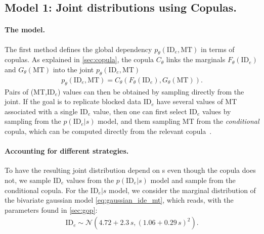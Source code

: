 \documentclass[acmlarge, manuscript,review]{acmart}
\newcommand{\mt}{\ensuremath{{\text{MT}}}\xspace}
\newcommand{\ide}{\ensuremath{{\text{ID}_e}}\xspace}
\begin{document}
\subsection{Model 1: Joint distributions using Copulas.\label{sub:model1}}

\paragraph{The model.} The first method defines the global dependency $p_{\theta}(\ide, \mt)$ in terms of copulas. As explained in \autoref{sec:copula}, the copula $C_{\theta}$ links the marginals $F_{\theta}(\ide)$ and $G_{\theta}(\mt)$ into the joint $p_{\theta}(\ide, \mt)$
\begin{align}
	p_{\theta}(\ide, \mt) = C_{\theta}(F_{\theta}(\ide), G_{\theta}(\mt)).
\end{align}
Pairs of (MT,\ide) values can then be obtained by sampling directly from the joint. If the goal is to replicate blocked data \ide have several values of MT associated with a single \ide value, then one can first select \ide values by sampling from the $p(\ide|s)$ model, and them sampling MT from the \textit{conditional} copula, which can be computed directly from the relevant copula~\cite{nelsen2006}.

\paragraph{Accounting for different strategies.} To have the resulting joint distribution depend on s even though the copula does not, we sample \ide values from the $p(\ide | s)$ model and sample from the conditional copula.
For the $\ide|s$ model, we consider the marginal distribution of the bivariate gaussian model \autoref{eq:gaussian_ide_mt}, which reads, with the parameters found in \autoref{sec:gop}:
\begin{align}
	\ide \sim \mathcal{N}(4.72 + 2.3\,s, (1.06 + 0.29\,s)^2). \label{eq:gauss_strategy_marginal}
\end{align}
\end{document}
